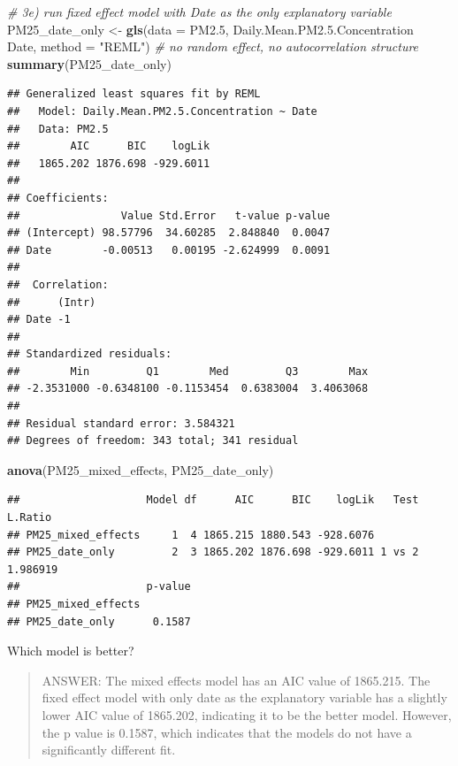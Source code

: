 \documentclass[]{article}
\newenvironment{Shaded}{\begin{snugshade}}{\end{snugshade}}
\newcommand{\KeywordTok}[1]{\textcolor[rgb]{0.13,0.29,0.53}{\textbf{#1}}}
\newcommand{\DataTypeTok}[1]{\textcolor[rgb]{0.13,0.29,0.53}{#1}}
\newcommand{\DecValTok}[1]{\textcolor[rgb]{0.00,0.00,0.81}{#1}}
\newcommand{\FloatTok}[1]{\textcolor[rgb]{0.00,0.00,0.81}{#1}}
\newcommand{\StringTok}[1]{\textcolor[rgb]{0.31,0.60,0.02}{#1}}
\newcommand{\CommentTok}[1]{\textcolor[rgb]{0.56,0.35,0.01}{\textit{#1}}}
\newcommand{\OperatorTok}[1]{\textcolor[rgb]{0.81,0.36,0.00}{\textbf{#1}}}
\newcommand{\NormalTok}[1]{#1}
\begin{document}
\begin{Shaded}
\begin{Highlighting}[]
\CommentTok{# 3e) run fixed effect model with Date as the only explanatory variable}
\NormalTok{PM25_date_only <-}\StringTok{ }\KeywordTok{gls}\NormalTok{(}\DataTypeTok{data =}\NormalTok{ PM2.}\DecValTok{5}\NormalTok{,}
\NormalTok{                     Daily.Mean.PM2.}\FloatTok{5.}\NormalTok{Concentration }\OperatorTok{~}\StringTok{ }\NormalTok{Date,}
                     \DataTypeTok{method =} \StringTok{"REML"}\NormalTok{) }\CommentTok{# no random effect, no autocorrelation structure}
\KeywordTok{summary}\NormalTok{(PM25_date_only)}
\end{Highlighting}
\end{Shaded}

\begin{verbatim}
## Generalized least squares fit by REML
##   Model: Daily.Mean.PM2.5.Concentration ~ Date 
##   Data: PM2.5 
##        AIC      BIC    logLik
##   1865.202 1876.698 -929.6011
## 
## Coefficients:
##                Value Std.Error   t-value p-value
## (Intercept) 98.57796  34.60285  2.848840  0.0047
## Date        -0.00513   0.00195 -2.624999  0.0091
## 
##  Correlation: 
##      (Intr)
## Date -1    
## 
## Standardized residuals:
##        Min         Q1        Med         Q3        Max 
## -2.3531000 -0.6348100 -0.1153454  0.6383004  3.4063068 
## 
## Residual standard error: 3.584321 
## Degrees of freedom: 343 total; 341 residual
\end{verbatim}

\begin{Shaded}
\begin{Highlighting}[]
\KeywordTok{anova}\NormalTok{(PM25_mixed_effects, PM25_date_only)}
\end{Highlighting}
\end{Shaded}

\begin{verbatim}
##                    Model df      AIC      BIC    logLik   Test  L.Ratio
## PM25_mixed_effects     1  4 1865.215 1880.543 -928.6076                
## PM25_date_only         2  3 1865.202 1876.698 -929.6011 1 vs 2 1.986919
##                    p-value
## PM25_mixed_effects        
## PM25_date_only      0.1587
\end{verbatim}

Which model is better?

\begin{quote}
ANSWER: The mixed effects model has an AIC value of 1865.215. The fixed
effect model with only date as the explanatory variable has a slightly
lower AIC value of 1865.202, indicating it to be the better model.
However, the p value is 0.1587, which indicates that the models do not
have a significantly different fit.
\end{quote}
\end{document}
